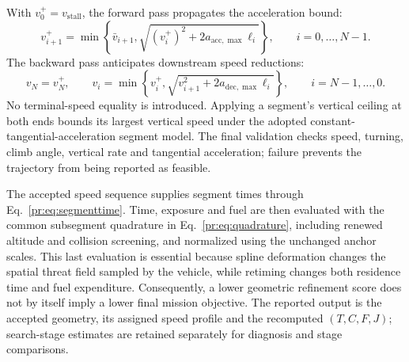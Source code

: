 With $v_0^+=v_{\mathrm{stall}}$, the forward pass propagates the acceleration
bound:
\begin{equation}
 v_{i+1}^+=\min\left\{\bar v_{i+1},
       \sqrt{(v_i^+)^2+2a_{\mathrm{acc},\max}\ell_i}\right\},
 \qquad i=0,\ldots,N-1.
 \label{me:eq:forward}
\end{equation}
The backward pass anticipates downstream speed reductions:
\begin{equation}
 v_N=v_N^+,\qquad
 v_i=\min\left\{v_i^+,
       \sqrt{v_{i+1}^2+2a_{\mathrm{dec},\max}\ell_i}\right\},
 \qquad i=N-1,\ldots,0.
 \label{me:eq:backward}
\end{equation}
No terminal-speed equality is introduced. Applying a segment's vertical
ceiling at both ends bounds its largest vertical speed under the adopted
constant-tangential-acceleration segment model. The final validation checks
speed, turning, climb angle, vertical rate and tangential acceleration;
failure prevents the trajectory from being reported as feasible.

The accepted speed sequence supplies segment times through
Eq.~\eqref{pr:eq:segmenttime}. Time, exposure and fuel are then evaluated
with the common subsegment quadrature in Eq.~\eqref{pr:eq:quadrature},
including renewed altitude and collision screening, and normalized using
the unchanged anchor scales. This last evaluation is essential because
spline deformation changes the spatial threat field sampled by the
vehicle, while retiming changes both residence time and fuel expenditure.
Consequently, a lower geometric refinement score does not by itself imply
a lower final mission objective. The reported output is the accepted
geometry, its assigned speed profile and the recomputed $(T,C,F,J)$;
search-stage estimates are retained separately for diagnosis and stage comparisons.

